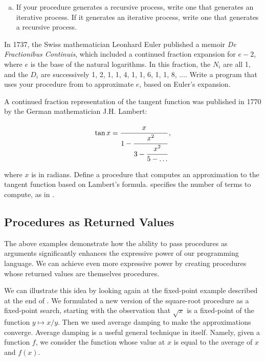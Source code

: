 \begin{exerciseGroup}
\begin{enumerate}[a.]
\noindent
for successive values of .  How large must you make  in order
to get an approximation that is accurate to 4 decimal places?

\item
If your  procedure generates a recursive process, write one
that generates an iterative process.  If it generates an iterative process,
write one that generates a recursive process.

\end{enumerate}

\label{Exercise 1.38}
 In 1737, the Swiss mathematician
Leonhard Euler published a memoir \textit{De Fractionibus Continuis}, which
included a continued fraction expansion for \( e - 2 \), where \( e \) is the base
of the natural logarithms.  In this fraction, the \( N_i \) are all 1, and
the \( D_i \) are successively 1, 2, 1, 1, 4, 1, 1, 6, 1, 1, 8, \( \dots \).
Write a program that uses your  procedure from 
to approximate \( e \), based on Euler's expansion.

\label{Exercise 1.39}
 A continued fraction
representation of the tangent function was published in 1770 by the German
mathematician J.H. Lambert:

$$ {\tan x} = \cfrac{x}{1 - \cfrac{x^2}{3 - \cfrac{x^2}{5 - \dots}}}\,, $$

\noindent
where \( x \) is in radians.  Define a procedure  that
computes an approximation to the tangent function based on Lambert's formula.
 specifies the number of terms to compute, as in .
\end{exerciseGroup}

\subsection{Procedures as Returned Values}
\label{Section 1.3.4}

The above examples demonstrate how the ability to pass procedures as arguments
significantly enhances the expressive power of our programming language.  We
can achieve even more expressive power by creating procedures whose returned
values are themselves procedures.

We can illustrate this idea by looking again at the fixed-point example
described at the end of .  We formulated a new version of
the square-root procedure as a fixed-point search, starting with the
observation that \( \sqrt{x} \) is a fixed-point of the function \( y \mapsto
x / y \).  Then we used average damping to make the approximations converge.
Average damping is a useful general technique in itself.  Namely, given a
function \( f \), we consider the function whose value at \( x \) is equal to the
average of \( x \) and \( f(x) \).

